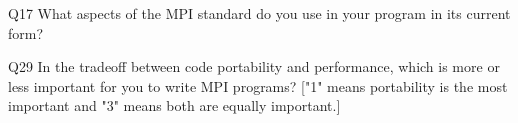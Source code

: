 \begin{description}%
\item{Q17} What aspects of the MPI standard do you use in your program in its current form?%
\item{Q29} In the tradeoff between code portability and performance, which is more or less important for you to write MPI programs? ["1" means portability is the most important and "3" means both are equally important.]%
\end{description}%

